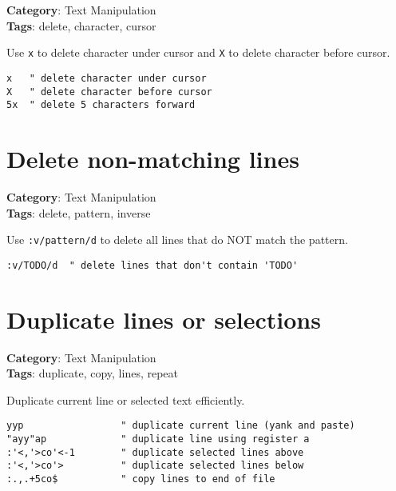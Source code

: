 {{{{{{{{{{{{{{\textbf{Category}: Text Manipulation\\ \textbf{Tags}: delete, character, cursor
\vspace{0.5cm}

Use {\footnotesize \Verb§x§} to delete character under cursor and {\footnotesize \Verb§X§} to delete character before cursor.

\begin{Exa*}{}
\begin{Verbatim}[fontsize=\footnotesize, breaklines, breakanywhere]
x   " delete character under cursor
X   " delete character before cursor
5x  " delete 5 characters forward
\end{Verbatim}
\end{Exa*}

\section{Delete non-matching lines}

\textbf{Category}: Text Manipulation\\ \textbf{Tags}: delete, pattern, inverse
\vspace{0.5cm}

Use {\footnotesize \Verb§:v/pattern/d§} to delete all lines that do NOT match the pattern.

\begin{Exa*}{}
\begin{Verbatim}[fontsize=\footnotesize, breaklines, breakanywhere]
:v/TODO/d  " delete lines that don't contain 'TODO'
\end{Verbatim}
\end{Exa*}

\section{Duplicate lines or selections}

\textbf{Category}: Text Manipulation\\ \textbf{Tags}: duplicate, copy, lines, repeat
\vspace{0.5cm}

Duplicate current line or selected text efficiently.

\begin{Exa*}{}
\begin{Verbatim}[fontsize=\footnotesize, breaklines, breakanywhere]
yyp                 " duplicate current line (yank and paste)
"ayy"ap             " duplicate line using register a
:'<,'>co'<-1        " duplicate selected lines above
:'<,'>co'>          " duplicate selected lines below
:.,.+5co$           " copy lines to end of file
\end{Verbatim}
\end{Exa*}

}}}}}}}}}}}}}}
